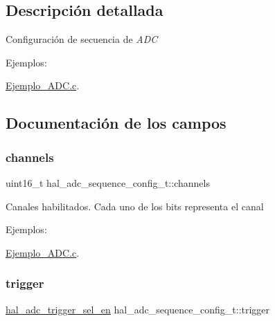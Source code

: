 \subsection{Descripción detallada}
Configuración de secuencia de {\itshape A\+DC} \begin{Desc}
\item[Ejemplos\+: ]\par
\hyperlink{Ejemplo_ADC_8c-example}{Ejemplo\+\_\+\+A\+D\+C.\+c}.\end{Desc}


\subsection{Documentación de los campos}
\mbox{\label{structhal__adc__sequence__config__t_acebe3f0fdc69a72787ddd6b19870641b}} 
\subsubsection{\texorpdfstring{channels}{channels}}
{\footnotesize\ttfamily uint16\+\_\+t hal\+\_\+adc\+\_\+sequence\+\_\+config\+\_\+t\+::channels}

Canales habilitados. Cada uno de los bits representa el canal \begin{Desc}
\item[Ejemplos\+: ]\par
\hyperlink{Ejemplo_ADC_8c-example}{Ejemplo\+\_\+\+A\+D\+C.\+c}.\end{Desc}
\mbox{\label{structhal__adc__sequence__config__t_a6bcb45974cab7522fa8fddd79fa7f1e1}} 
\subsubsection{\texorpdfstring{trigger}{trigger}}
{\footnotesize\ttfamily \hyperlink{group__ADC_ga67fe859b54301579f1b1daef874514ca}{hal\+\_\+adc\+\_\+trigger\+\_\+sel\+\_\+en} hal\+\_\+adc\+\_\+sequence\+\_\+config\+\_\+t\+::trigger}

